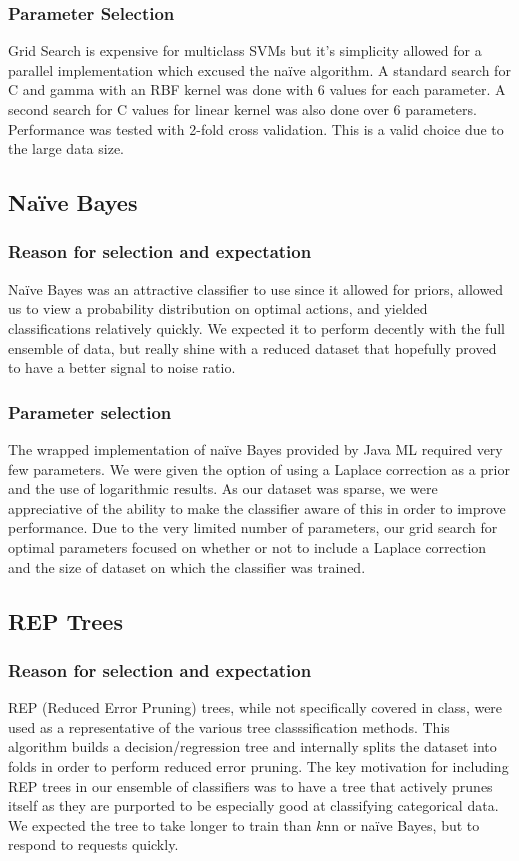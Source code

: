 \documentclass[]{article}   %
\begin{document}
\subsubsection{Parameter Selection}
Grid Search is expensive for multiclass SVMs but it's simplicity allowed for a parallel implementation which excused the na\"{i}ve algorithm.  A standard search for C and gamma with an RBF kernel was done with 6 values for each parameter. A second search for C values for linear kernel was also done over 6 parameters.  Performance was tested with 2-fold cross validation. This is a valid choice due to the large data size.


\subsection{Na\"{i}ve Bayes}
\subsubsection{Reason for selection and expectation}
Na\"{i}ve Bayes was an attractive classifier to use since it allowed for priors, allowed us to view a probability 
distribution on optimal actions, and yielded classifications relatively quickly. We expected it to perform decently 
with the full ensemble of data, but really shine with a reduced dataset that hopefully proved to have a better 
signal to noise ratio. 

\subsubsection{Parameter selection}
The wrapped implementation of na\"{i}ve Bayes provided by Java ML required very few parameters. We were given the 
option of using a Laplace correction as a prior and the use of logarithmic results. As our dataset was sparse, we 
were appreciative of the ability to make the classifier aware of this in order to improve performance. Due to the 
very limited number of parameters, our grid search for optimal parameters focused on whether or not to include a 
Laplace correction and the size of dataset on which the classifier was trained. 

\subsection{REP Trees}
\subsubsection{Reason for selection and expectation}
REP (Reduced Error Pruning) trees, while not specifically covered in class, were used as a representative of the 
various tree classsification methods. This algorithm builds a decision/regression tree and internally splits the 
dataset into folds in order to perform reduced error pruning. The key motivation for including REP trees in our 
ensemble of classifiers was to have a tree that actively prunes itself as they are purported to be especially good 
at classifying categorical data. We expected the tree to take longer to train than $k$nn or na\"{i}ve Bayes, but to 
respond to requests quickly.
\end{document}
